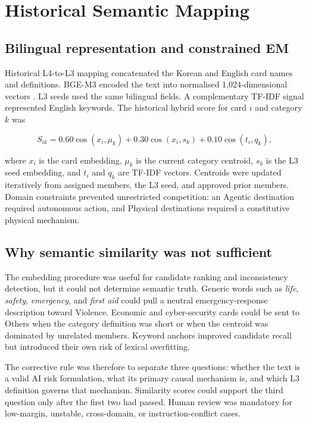 \documentclass[10pt,a4paper]{article}
\begin{document}
\section{Historical Semantic Mapping}

\subsection{Bilingual representation and constrained EM}

Historical L4-to-L3 mapping concatenated the Korean and English card names and definitions. BGE-M3 encoded the text into normalised 1,024-dimensional vectors \citep{chen2024}. L3 seeds used the same bilingual fields. A complementary TF-IDF signal represented English keywords. The historical hybrid score for card $i$ and category $k$ was

\begin{equation}
S_{ik}=0.60\cos(x_i,\mu_k)+0.30\cos(x_i,s_k)+0.10\cos(t_i,q_k),
\end{equation}

where $x_i$ is the card embedding, $\mu_k$ is the current category centroid, $s_k$ is the L3 seed embedding, and $t_i$ and $q_k$ are TF-IDF vectors. Centroids were updated iteratively from assigned members, the L3 seed, and approved prior members. Domain constraints prevented unrestricted competition: an Agentic destination required autonomous action, and Physical destinations required a constitutive physical mechanism.

\subsection{Why semantic similarity was not sufficient}

The embedding procedure was useful for candidate ranking and inconsistency detection, but it could not determine semantic truth. Generic words such as \emph{life}, \emph{safety}, \emph{emergency}, and \emph{first aid} could pull a neutral emergency-response description toward Violence. Economic and cyber-security cards could be sent to Others when the category definition was short or when the centroid was dominated by unrelated members. Keyword anchors improved candidate recall but introduced their own risk of lexical overfitting.

The corrective rule was therefore to separate three questions: whether the text is a valid AI risk formulation, what its primary causal mechanism is, and which L3 definition governs that mechanism. Similarity scores could support the third question only after the first two had passed. Human review was mandatory for low-margin, unstable, cross-domain, or instruction-conflict cases.
\end{document}
